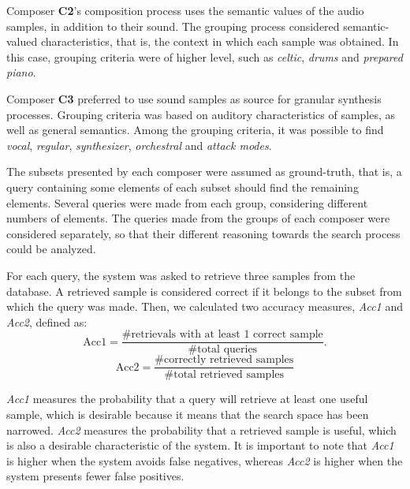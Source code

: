 \documentclass{article}
\begin{document}
Composer \textbf{C2}'s composition process uses the semantic
values of the audio samples, in addition to their sound. The grouping
process considered semantic-valued characteristics, that is, the
context in which each sample was obtained. In this case, grouping
criteria were of higher level, such as \textit{celtic}, \textit{drums}
and \textit{prepared piano}.

Composer \textbf{C3} preferred to use sound samples as source for
granular synthesis processes. Grouping criteria was based on auditory
characteristics of samples, as well as general semantics. Among the
grouping criteria, it was possible to find \textit{vocal},
\textit{regular}, \textit{synthesizer},
\textit{orchestral} and \textit{attack modes}.

The subsets presented by each composer were assumed as ground-truth,
that is, a query containing some elements of each subset should find
the remaining elements. Several queries were made from each group,
considering different numbers of elements. The queries made from the
groups of each composer were considered separately, so that their
different reasoning towards the search process could be analyzed.

For each query, the system was asked to retrieve three samples from
the database. A retrieved sample is considered correct if it belongs to the
subset from which the query was made. Then, we calculated two accuracy
measures, \textit{Acc1} and \textit{Acc2}, defined as:
\begin{equation}
\mbox{Acc1} = \frac{\mbox{\# retrievals with at least 1 correct
    sample}}{\mbox{\# total queries} }.
\end{equation}
\begin{equation}
\mbox{Acc2} = \frac{\mbox{\# correctly retrieved samples}}{ \mbox{\# total retrieved samples} }
\end{equation}

\textit{Acc1} measures the probability that a query will retrieve at
least one useful sample, which is desirable because it means that the
search space has been narrowed. \textit{Acc2} measures the probability
that a retrieved sample is useful, which is also a desirable
characteristic of the system. It is important to note that
\textit{Acc1} is higher when the system avoids false negatives,
whereas \textit{Acc2} is higher when the system presents fewer false
positives.
\end{document}
